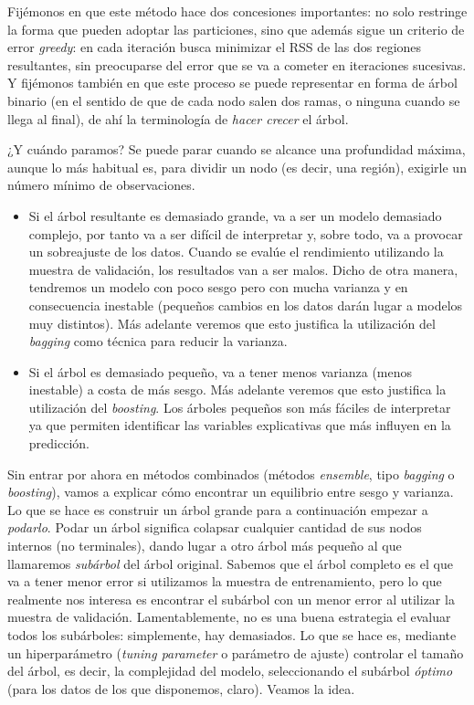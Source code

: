 \documentclass[
]{book}
\theoremstyle{break}
\theoremstyle{nonumberplain}
\begin{document}
Fijémonos en que este método hace dos concesiones importantes: no solo restringe la forma
que pueden adoptar las particiones, sino que además sigue un criterio de error \emph{greedy}:
en cada iteración busca minimizar el RSS de las dos regiones resultantes, sin preocuparse
del error que se va a cometer en iteraciones sucesivas. Y fijémonos también en que este
proceso se puede representar en forma de árbol binario (en el sentido de que de cada nodo
salen dos ramas, o ninguna cuando se llega al final), de ahí la terminología de \emph{hacer
crecer} el árbol.

¿Y cuándo paramos? Se puede parar cuando se alcance una profundidad máxima, aunque lo
más habitual es, para dividir un nodo (es decir, una región), exigirle un número mínimo
de observaciones.

\begin{itemize}
\item
  Si el árbol resultante es demasiado grande, va a ser un modelo demasiado complejo,
  por tanto va a ser difícil de interpretar y, sobre todo,
  va a provocar un sobreajuste de los datos. Cuando se evalúe el rendimiento utilizando
  la muestra de validación, los resultados van a ser malos. Dicho de otra manera, tendremos un
  modelo con poco sesgo pero con mucha varianza y en consecuencia inestable (pequeños
  cambios en los datos darán lugar a modelos muy distintos). Más adelante veremos que esto
  justifica la utilización del \emph{bagging} como técnica para reducir la varianza.
\item
  Si el árbol es demasiado pequeño, va a tener menos varianza (menos inestable) a costa
  de más sesgo. Más adelante veremos que esto justifica la utilización del \emph{boosting}. Los
  árboles pequeños son más fáciles de interpretar ya que permiten identificar las variables
  explicativas que más influyen en la predicción.
\end{itemize}

Sin entrar por ahora en métodos combinados (métodos \emph{ensemble}, tipo \emph{bagging} o \emph{boosting}),
vamos a explicar cómo encontrar un equilibrio entre sesgo y varianza. Lo que se hace es
construir un árbol grande para a continuación empezar a \emph{podarlo}. Podar un árbol significa
colapsar cualquier cantidad de sus nodos internos (no terminales), dando lugar a otro árbol más
pequeño al que llamaremos \emph{subárbol} del árbol original. Sabemos que el árbol completo es
el que va a tener menor error si utilizamos la muestra de entrenamiento, pero lo que
realmente nos interesa es encontrar el subárbol con un menor error al utilizar la muestra
de validación. Lamentablemente, no es una buena estrategia el evaluar todos los subárboles:
simplemente, hay demasiados. Lo que se hace es, mediante un
hiperparámetro (\emph{tuning parameter} o parámetro de ajuste) controlar el tamaño del árbol,
es decir, la complejidad del modelo, seleccionando el subárbol \emph{óptimo} (para los datos
de los que disponemos, claro). Veamos la idea.
\end{document}
